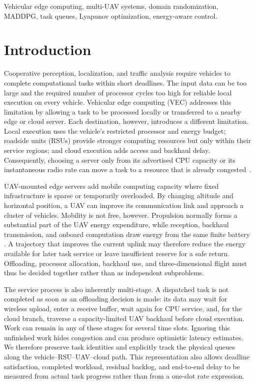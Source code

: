 \documentclass[journal]{IEEEtran}
\begin{document}
\begin{IEEEkeywords}
Vehicular edge computing, multi-UAV systems, domain randomization, MADDPG,
task queues, Lyapunov optimization, energy-aware control.
\end{IEEEkeywords}

\section{Introduction}
Cooperative perception, localization, and traffic analysis require vehicles
to complete computational tasks within short deadlines. The input data can be
too large and the required number of processor cycles too high for reliable
local execution on every vehicle. Vehicular edge computing (VEC) addresses
this limitation by allowing a task to be processed locally or transferred to
a nearby edge or cloud server. Each destination, however, introduces a
different limitation. Local execution uses the vehicle's restricted processor
and energy budget; roadside units (RSUs) provide stronger computing resources
but only within their service regions; and cloud execution adds access and
backhaul delay. Consequently, choosing a server only from its advertised CPU
capacity or its instantaneous radio rate can move a task to a resource that is
already congested~\cite{liu2020uav,liang2025rav}.

UAV-mounted edge servers add mobile computing capacity where fixed
infrastructure is sparse or temporarily overloaded. By changing altitude and
horizontal position, a UAV can improve its communication link and approach a
cluster of vehicles. Mobility is not free, however. Propulsion normally forms
a substantial part of the UAV energy expenditure, while reception, backhaul
transmission, and onboard computation draw energy from the same finite battery
\cite{liu2020uav,talukdar2026mappo}. A trajectory that improves the current
uplink may therefore reduce the energy available for later task service or
leave insufficient reserve for a safe return. Offloading, processor
allocation, backhaul use, and three-dimensional flight must thus be decided
together rather than as independent subproblems.

The service process is also inherently multi-stage. A dispatched task is not
completed as soon as an offloading decision is made: its data may wait for
wireless upload, enter a receive buffer, wait again for CPU service, and, for
the cloud branch, traverse a capacity-limited UAV backhaul before cloud
execution. Work can remain in any of these stages for several time slots.
Ignoring this unfinished work hides congestion and can produce optimistic
latency estimates. We therefore preserve task identities and explicitly track
the physical queues along the vehicle--RSU--UAV--cloud path. This representation
also allows deadline satisfaction, completed workload, residual backlog, and
end-to-end delay to be measured from actual task progress rather than from a
one-slot rate expression.
\end{document}
